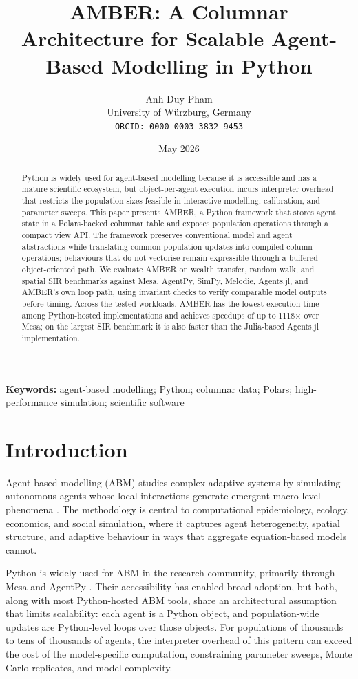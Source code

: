 \documentclass[11pt,a4paper]{article}
\title{\textbf{AMBER: A Columnar Architecture for Scalable Agent-Based Modelling in Python}}
\author{Anh-Duy Pham\\
\small University of Würzburg, Germany\\
\small \texttt{ORCID: 0000-0003-3832-9453}
}
\date{May 2026}
\begin{document}
\maketitle

\begin{abstract}
Python is widely used for agent-based modelling because it is accessible and has a mature scientific ecosystem, but object-per-agent execution incurs interpreter overhead that restricts the population sizes feasible in interactive modelling, calibration, and parameter sweeps. This paper presents AMBER, a Python framework that stores agent state in a Polars-backed columnar table and exposes population operations through a compact view API. The framework preserves conventional model and agent abstractions while translating common population updates into compiled column operations; behaviours that do not vectorise remain expressible through a buffered object-oriented path. We evaluate AMBER on wealth transfer, random walk, and spatial SIR benchmarks against Mesa, AgentPy, SimPy, Melodie, Agents.jl, and AMBER's own loop path, using invariant checks to verify comparable model outputs before timing. Across the tested workloads, AMBER has the lowest execution time among Python-hosted implementations and achieves speedups of up to 1118$\times$ over Mesa; on the largest SIR benchmark it is also faster than the Julia-based Agents.jl implementation.
\end{abstract}

\vspace{1em}
\noindent\textbf{Keywords:} agent-based modelling; Python; columnar data; Polars; high-performance simulation; scientific software

\section{Introduction}

Agent-based modelling (ABM) studies complex adaptive systems by simulating autonomous agents whose local interactions generate emergent macro-level phenomena \citep{abar2017agent}. The methodology is central to computational epidemiology, ecology, economics, and social simulation, where it captures agent heterogeneity, spatial structure, and adaptive behaviour in ways that aggregate equation-based models cannot.

Python is widely used for ABM in the research community, primarily through Mesa \citep{masad2015mesa} and AgentPy \citep{foramitti2021agentpy}. Their accessibility has enabled broad adoption, but both, along with most Python-hosted ABM tools, share an architectural assumption that limits scalability: each agent is a Python object, and population-wide updates are Python-level loops over those objects. For populations of thousands to tens of thousands of agents, the interpreter overhead of this pattern can exceed the cost of the model-specific computation, constraining parameter sweeps, Monte Carlo replicates, and model complexity.
\end{document}
